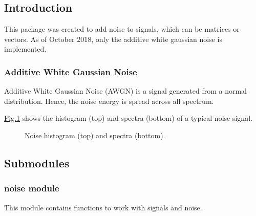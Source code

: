 \documentclass[letterpaper,10pt,english]{sphinxmanual}
\begin{document}
\subsection{Introduction}
\label{\detokenize{pynoise:introduction}}
This package was created to add noise to signals, which can be matrices or
vectors. As of October 2018, only the additive white gaussian noise is
implemented.


\subsubsection{Additive White Gaussian Noise}
\label{\detokenize{pynoise:additive-white-gaussian-noise}}
Additive White Gaussian Noise (AWGN) is a signal generated from a normal
distribution. Hence, the noise energy is spread across all spectrum.

\hyperref[\detokenize{pynoise:fig-noise-spectra}]{Fig.\@ \ref{\detokenize{pynoise:fig-noise-spectra}}} shows the histogram (top) and spectra (bottom)
of a typical noise signal.

\begin{figure}[htbp]
\centering
\capstart

\noindent{}
\caption{Noise histogram (top) and spectra (bottom).}\label{\detokenize{pynoise:id1}}\label{\detokenize{pynoise:fig-noise-spectra}}\end{figure}


\subsection{Submodules}
\label{\detokenize{pynoise:submodules}}\label{\detokenize{pynoise.noise:module-pynoise.noise}}

\subsubsection{noise module}
\label{\detokenize{pynoise.noise:noise-module}}\label{\detokenize{pynoise.noise::doc}}
This module contains functions to work with signals and noise.

\label{\detokenize{pynoise.noise:module-noise}}
\end{document}
